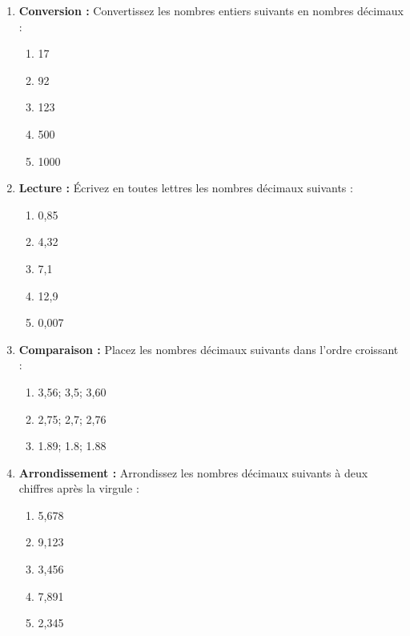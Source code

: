 \documentclass{article}
\begin{document}
\begin{tcolorbox}[colback=yellow!10!white, colframe=yellow!75!black, sharp corners=south, boxrule=0.8mm, title=Exercices]
    \begin{enumerate}[label=\textbf{\arabic*.}]
        \item \textbf{Conversion :} Convertissez les nombres entiers suivants en nombres décimaux :
            \begin{enumerate}
                \item 17
                \item 92
                \item 123
                \item 500
                \item 1000
            \end{enumerate}

        \item \textbf{Lecture :} Écrivez en toutes lettres les nombres décimaux suivants :
            \begin{enumerate}
                \item 0,85
                \item 4,32
                \item 7,1
                \item 12,9
                \item 0,007
            \end{enumerate}

        \item \textbf{Comparaison :} Placez les nombres décimaux suivants dans l'ordre croissant :
            \begin{enumerate}
                \item 3,56; 3,5; 3,60
                \item 2,75; 2,7; 2,76
                \item 1.89; 1.8; 1.88
            \end{enumerate}

        \item \textbf{Arrondissement :} Arrondissez les nombres décimaux suivants à deux chiffres après la virgule :
            \begin{enumerate}
                \item 5,678
                \item 9,123
                \item 3,456
                \item 7,891
                \item 2,345
            \end{enumerate}


\end{enumerate}
\end{tcolorbox}
\end{document}
